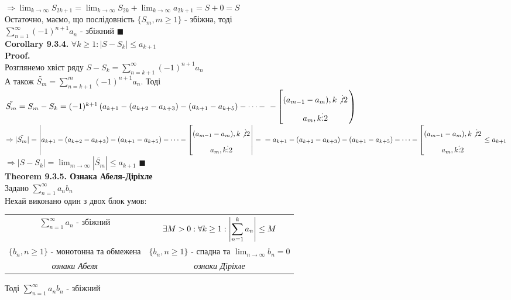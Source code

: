 \documentclass[a4paper, 14pt]{extarticle}
\def\huge{\displaystyle}
\def\bigline{\vspace{5mm}\\}
\def\th#1{\textbf{Theorem {#1}}}
\def\crl#1{\textbf{Corollary {#1}}}
\def\proof{\textbf{Proof.}\\}
\def\bigline{\vspace{5mm}\\}
\def\qed{$\blacksquare$}
\begin{document}
$\Rightarrow \huge \lim_{k \to \infty} S_{2k+1} = \lim_{k \to \infty} S_{2k} + \lim_{k \to \infty} a_{2k+1} = S + 0 = S$\\
Остаточно, маємо, що послідовність $\{S_m, m \geq 1\}$ - збіжна, тоді\\
$\huge \sum_{n=1}^\infty (-1)^{n+1}a_n$ - збіжний \qed
\bigline
\crl{9.3.4.} $\forall k \geq 1: |S-S_k| \leq a_{k+1}$\\
\proof
Розглянемо хвіст ряду $S-S_k = \huge \sum_{n=k+1}^{\infty} (-1)^{n+1}a_n$\\
А також $\tilde{S_m} = \huge \sum_{n=k+1}^{m} (-1)^{n+1}a_n$. Тоді\\
$\tilde{S_m} = S_m - S_k = (-1)^{k+1} \left(a_{k+1}-(a_{k+2}-a_{k+3})-(a_{k+1}-a_{k+5}) - \dots - \right. \\ \left. - \left[ \begin{gathered} (a_{m-1}-a_m), k \not \vdots 2 \\ a_m, k \vdots 2 \end{gathered} \right. \right)$\\
$\Rightarrow |\tilde{S_m}| = \left|a_{k+1}-(a_{k+2}-a_{k+3})-(a_{k+1}-a_{k+5}) - \dots - \left[ \begin{gathered} (a_{m-1}-a_m), k \not \vdots 2 \\ a_m, k \vdots 2 \end{gathered} \right. \right| = \\
= a_{k+1}-(a_{k+2}-a_{k+3})-(a_{k+1}-a_{k+5}) - \dots - \left[ \begin{gathered} (a_{m-1}-a_m), k \not \vdots 2 \\ a_m, k \vdots 2 \end{gathered} \right. \leq a_{k+1}$\\
$\Rightarrow |S - S_k| = \huge \lim_{m \to \infty} |\tilde{S_m}| \leq a_{k+1}$ \qed
\bigline
\th{9.3.5. Ознака Абеля-Діріхле}\\
Задано $\huge \sum_{n=1}^{\infty} a_n b_n$\\
Нехай виконано один з двох блок умов:\\
\begin{tabular}{c | c}
$\huge \sum_{n=1}^{\infty} a_n$ - збіжний & $\exists M > 0: \forall k \geq 1: \huge \abs{\sum_{n=1}^k a_n} \leq M$ \\
$\{b_n, n \geq 1\}$ - монотонна та обмежена & $\{b_n, n \geq 1\}$ - спадна та $\huge \lim_{n \to \infty} b_n = 0$ \\
\textit{ознаки Абеля} & \textit{ознаки Діріхле}
\end{tabular}
Тоді $\huge \sum_{n=1}^{\infty} a_n b_n$ - збіжний
\end{document}
